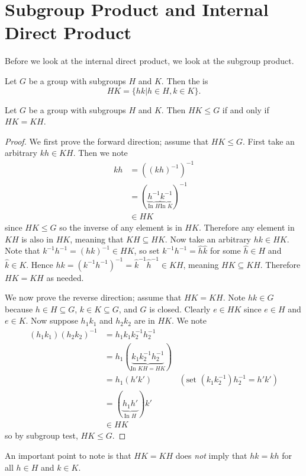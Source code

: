 \section{Subgroup Product and Internal Direct Product}
Before we look at the internal direct product, we look at the subgroup product.
\begin{definition}\label{definition-subgroup-product}
    Let $G$ be a group with subgroups $H$ and $K$. Then the  is
    \[
        HK = \{hk \vert h \in H, k \in K\}.
    \]
\end{definition}

\begin{proposition}\label{prop-subgroup-product-is-subgroup}
    Let $G$ be a group with subgroups $H$ and $K$. Then $HK \leq G$ if and only if $HK = KH$.
\end{proposition}
\begin{proof}
    We first prove the forward direction; assume that $HK \leq G$. First take an arbitrary $kh \in KH$. Then we note
    \begin{align*}
        kh &= \left(\left(kh\right)^{-1}\right)^{-1}\\
        &= (\underbrace{h^{-1}}_{\text{In } H}\underbrace{k^{-1}}_{\text{In } K})^{-1}\\
        &\in HK
    \end{align*}
    since $HK \leq G$ so the inverse of any element is in $HK$. Therefore any element in $KH$ is also in $HK$, meaning that $KH \subseteq HK$. Now take an arbitrary $hk \in HK$. Note that $k^{-1}h^{-1} = (hk)^{-1} \in HK$, so set $k^{-1}h^{-1} = \hat{h}\hat{k}$ for some $\hat{h} \in H$ and $\hat{k} \in K$. Hence $hk = \left(k^{-1}h^{-1}\right)^{-1} = \hat{k}^{-1}\hat{h}^{-1} \in KH$, meaning $HK \subseteq KH$. Therefore $HK = KH$ as needed.

    We now prove the reverse direction; assume that $HK = KH$. Note $hk \in G$ because $h \in H \subseteq G$, $k \in K \subseteq G$, and $G$ is closed. Clearly $e \in HK$ since $e \in H$ and $e \in K$. Now suppose $h_1k_1$ and $h_2k_2$ are in $HK$. We note
    \begin{align*}
        (h_1k_1)(h_2k_2)^{-1} &= h_1k_1k_2^{-1}h_2^{-1}\\
        &= h_1(\underbrace{k_1k_2^{-1}h_2^{-1}}_{\text{In } KH = HK})\\
        &= h_1(h'k') & (\text{set }(k_1k_2^{-1})h_2^{-1} = h'k')\\
        &= (\underbrace{h_1h'}_{\text{In } H})k'\\
        &\in HK
    \end{align*}
    so by subgroup test, $HK \leq G$.
\end{proof}
\begin{remark}
    An important point to note is that $HK = KH$ does \textit{not} imply that $hk = kh$ for all $h \in H$ and $k \in K$.
\end{remark}

